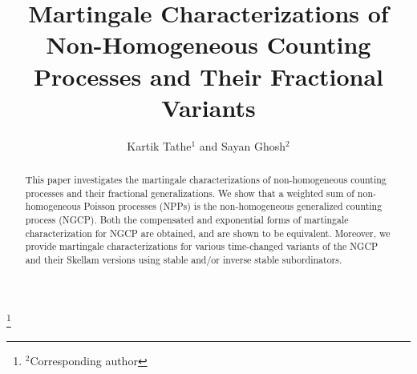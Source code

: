 \documentclass[11pt,oneside,reqno]{amsart}
\theoremstyle{definition}
\theoremstyle{remarkstyle}
\begin{document}
\color{black}       %
%
\title{Martingale Characterizations of Non-Homogeneous Counting Processes and Their Fractional Variants}



\author{Kartik Tathe$^1$ and Sayan Ghosh$^2$}
\address{Department of Mathematics, Birla Institute of Technology and Science, Pilani, Hyderabad Campus, Jawahar Nagar, Kapra Mandal, Medchal District, Telangana 500078, India. }
\thanks{$^2$Corresponding author}







\begin{abstract}
This paper investigates the martingale characterizations of non-homogeneous counting processes and their fractional generalizations. We show that a weighted sum of non-homogeneous Poisson processes (NPPs) is the non-homogeneous generalized counting process (NGCP). Both the compensated and exponential forms of martingale characterization for NGCP are obtained, and are shown to be equivalent. Moreover, we provide martingale characterizations for various time-changed variants of the NGCP and their Skellam versions using stable and/or inverse stable subordinators.
\end{abstract}
\end{document}
